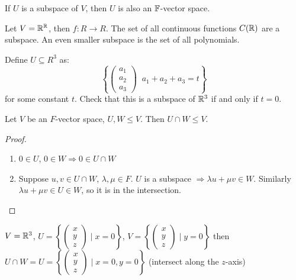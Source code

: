 \documentclass[a4paper]{article}
\begin{document}
\begin{ex}
	If $ U $ is a subspace of $ V $, then $ U $ is also an $ \mathbb{F} $-vector space.
\end{ex}

\begin{eg}
	Let $ V = \mathbb{R}^{\mathbb{R}} $, then $ f : R \to R $. The set of all continuous functions $ C(\mathbb{R}) $ are a subspace. An even smaller subspace is the set of all polynomials.
\end{eg}


\begin{ex} Define $ U \subseteq R^{3} $ as: 
	\[ \left\{   \begin{pmatrix}
a_{1} \\
a_{2} \\
a_{3}
\end{pmatrix} \; \; a_{1} + a_{2} + a_{3} = t \right\} \]
for some constant  $ t $. 
Check that this is a subspace of $ \mathbb{R}^{3} $ if and only if $ t = 0 $.
\end{ex}

\begin{prop} 
	Let $ V $ be an $ F $-vector space, $ U,W \leq V $. Then $ U \cap W \leq V $.	
\end{prop}

\begin{proof}
	\begin{enumerate}
		\item 	$ 0 \in U $, $ 0 \in W  \Rightarrow 0 \in U \cap W $ 
		\item Suppose $ u,v \in U \cap W $, $ \lambda, \mu \in F $.
		$ U $ is a subspace $ \Rightarrow  \lambda u + \mu v \in W $. Similarly $ \lambda u + \mu v \in U \in W $, so it is in the intersection. 
	\end{enumerate}
\end{proof}

\begin{eg}
	$ V = \mathbb{R}^{3} $, $ U = \left\{ \begin{pmatrix}
	x\\
	y\\
	z
	\end{pmatrix} \; | \; x = 0 \right\} $, $ V = \left\{ \begin{pmatrix}
	x\\
	y\\
	z
	\end{pmatrix} \; | \; y = 0 \right\}  $ then $ U \cap W = U = \left\{ \begin{pmatrix}
	x\\
	y\\
	z
	\end{pmatrix} \; | \; x = 0, y= 0 \right\}  $ (intersect along the $ z $-axis)
\end{eg}
\end{document}
